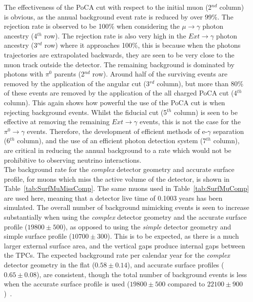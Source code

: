 The effectiveness of the PoCA cut with respect to the initial muon (2$^{nd}$ column) is obvious, as the annual background event rate is reduced by over 99\%. The rejection rate is observed to be 100\% when considering the $\mu\to\gamma$ photon ancestry (4$^{th}$ row). The rejection rate is also very high in the $Ext\to\gamma$ photon ancestry (3$^{rd}$ row) where it approaches 100\%, this is because when the photons trajectories are extrapolated backwards, they are seen to be very close to the muon track outside the detector. The remaining background is dominated by photons with $\pi^{0}$ parents (2$^{nd}$ row). Around half of the surviving events are removed by the application of the angular cut (3$^{rd}$ column), but more than 80\% of these events are removed by the application of the all charged PoCA cut (4$^{th}$ column). This again shows how powerful the use of the PoCA cut is when rejecting background events. Whilst the fiducial cut (5$^{th}$ column) is seen to be effective at removing the remaining $Ext\to\gamma$ events, this is not the case for the $\pi^0\to\gamma$ events. Therefore, the development of efficient methods of e-$\gamma$ separation (6$^{th}$ column), and the use of an efficient photon detection system (7$^{th}$ column), are critical in reducing the annual background to a rate which would not be prohibitive to observing neutrino interactions. \\

The background rate for the \emph{complex} detector geometry and accurate surface profile, for muons which miss the active volume of the detector, is shown in Table~\ref{tab:SurfMuMissComp}. The same muons used in Table~\ref{tab:SurfMuComp} are used here, meaning that a detector live time of 0.1003 years has been simulated. The overall number of background mimicking events is seen to increase substantially  when using the \emph{complex} detector geometry and the accurate surface profile ($19800\pm500$), as opposed to using the \emph{simple} detector geometry and simple surface profile ($10700\pm300$). This is to be expected, as there is a much larger external surface area, and the vertical gaps produce internal gaps between the TPCs. The expected background rate per calendar year for the \emph{complex} detector geometry in the flat ($0.58\pm0.14$), and accurate surface profiles ($0.65\pm0.08$), are consistent, though the total number of background events is less when the accurate surface profile is used ($19800\pm500$ compared to $22100\pm900$)~\citep{MartinsThesis}. \\


